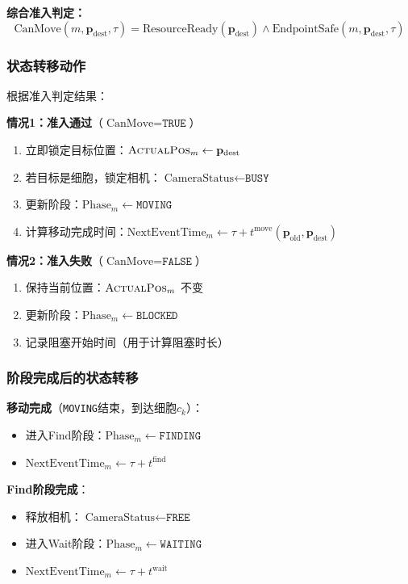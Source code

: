 \documentclass[11pt,a4paper]{article}
\begin{document}
\textbf{综合准入判定：}
\begin{equation}
    \text{CanMove}(m, \mathbf{p}_{\text{dest}}, \tau) = \text{ResourceReady}(\mathbf{p}_{\text{dest}}) \land \text{EndpointSafe}(m, \mathbf{p}_{\text{dest}}, \tau)
\end{equation}

\subsubsection{状态转移动作}

根据准入判定结果：

\textbf{情况1：准入通过}（$\text{CanMove} = \texttt{TRUE}$）
\begin{enumerate}
    \item 立即锁定目标位置：$\textsc{ActualPos}_m \leftarrow \mathbf{p}_{\text{dest}}$
    \item 若目标是细胞，锁定相机：$\text{CameraStatus} \leftarrow \texttt{BUSY}$
    \item 更新阶段：$\text{Phase}_m \leftarrow \texttt{MOVING}$
    \item 计算移动完成时间：$\text{NextEventTime}_m \leftarrow \tau + t^{\text{move}}(\mathbf{p}_{\text{old}}, \mathbf{p}_{\text{dest}})$
\end{enumerate}

\textbf{情况2：准入失败}（$\text{CanMove} = \texttt{FALSE}$）
\begin{enumerate}
    \item 保持当前位置：$\textsc{ActualPos}_m$ 不变
    \item 更新阶段：$\text{Phase}_m \leftarrow \texttt{BLOCKED}$
    \item 记录阻塞开始时间（用于计算阻塞时长）
\end{enumerate}

\subsubsection{阶段完成后的状态转移}

\textbf{移动完成}（\texttt{MOVING}结束，到达细胞$c_k$）：
\begin{itemize}
    \item 进入Find阶段：$\text{Phase}_m \leftarrow \texttt{FINDING}$
    \item $\text{NextEventTime}_m \leftarrow \tau + t^{\text{find}}$
\end{itemize}

\textbf{Find阶段完成}：
\begin{itemize}
    \item 释放相机：$\text{CameraStatus} \leftarrow \texttt{FREE}$
    \item 进入Wait阶段：$\text{Phase}_m \leftarrow \texttt{WAITING}$
    \item $\text{NextEventTime}_m \leftarrow \tau + t^{\text{wait}}$
\end{itemize}
\end{document}

